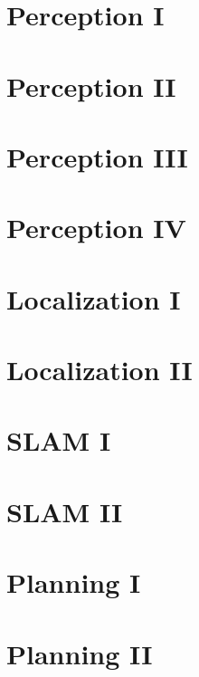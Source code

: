 \documentclass[8pt,landscape]{article}
\begin{document}
\begin{multicols}{3}
\blindtext[3]

\section{Perception I}

\blindtext[3]

\section{Perception II}

\blindtext[3]

\section{Perception III}

\blindtext[3]

\section{Perception IV}

\blindtext[3]

\section{Localization I}

\blindtext[3]

\section{Localization II}

\blindtext[3]

\section{SLAM I}

\blindtext[3]

\section{SLAM II}

\blindtext[3]

\section{Planning I}

\blindtext[3]

\section{Planning II}

\blindtext[3]





\end{multicols}

\end{document}
